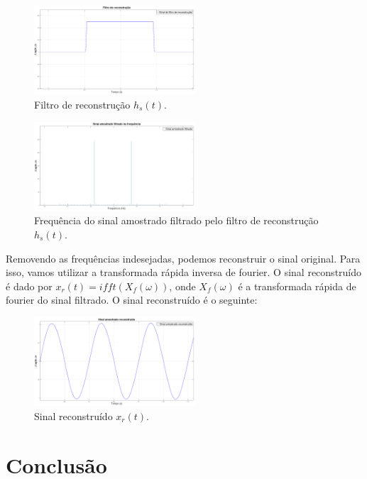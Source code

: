 \documentclass[journal]{IEEEtran}
\begin{document}
\begin{figure}[H]
\captionsetup{justification=centering}
\centering %
\includegraphics[width=6cm]{filtro_reconstrucao_00.png} %
\caption{Filtro de reconstrução $h_s(t)$.}
\end{figure}

\begin{figure}[H]
\captionsetup{justification=centering}
\centering %
\includegraphics[width=6cm]{frequencia_sinal_amostrado_filtrado.png} %
\caption{Frequência do sinal amostrado filtrado pelo filtro de reconstrução $h_s(t)$.}
\end{figure}

Removendo as frequências indesejadas, podemos reconstruir o sinal original. Para isso, vamos utilizar a transformada rápida inversa de fourier. O sinal reconstruído é dado por $x_r(t) = ifft(X_f(\omega))$, onde $X_f(\omega)$ é a transformada rápida de fourier do sinal filtrado. O sinal reconstruído é o seguinte:

\begin{figure}[H]
\captionsetup{justification=centering}
\centering %
\includegraphics[width=6cm]{sinal_amostrado_reconstruido_40Hz.png} %
\caption{Sinal reconstruído $x_r(t)$.}
\end{figure}

\section{Conclusão}
\end{document}
